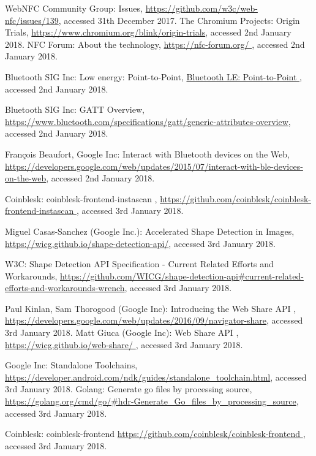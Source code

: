 \begin{thebibliography}{99}
WebNFC Community Group: Issues, \url{https://github.com/w3c/web-nfc/issues/139}, accessed 31th December 2017.
The Chromium Projects: Origin Trials, \url{https://www.chromium.org/blink/origin-trials}, accessed 2nd January 2018.
NFC Forum: About the technology, \url{https://nfc-forum.org/
}, accessed 2nd January 2018.

Bluetooth SIG Inc: Low energy: Point-to-Point, \url{Bluetooth LE: Point-to-Point
}, accessed 2nd January 2018.

Bluetooth SIG Inc: GATT Overview, \url{https://www.bluetooth.com/specifications/gatt/generic-attributes-overview}, accessed 2nd January 2018.

François Beaufort, Google Inc: Interact with Bluetooth devices on the Web, \url{https://developers.google.com/web/updates/2015/07/interact-with-ble-devices-on-the-web}, accessed 2nd January 2018.

Coinblesk: coinblesk-frontend-instascan
, \url{https://github.com/coinblesk/coinblesk-frontend-instascan
}, accessed 3rd January 2018.

Miguel Casas-Sanchez (Google Inc.): Accelerated Shape Detection in Images, \url{https://wicg.github.io/shape-detection-api/}, accessed 3rd January 2018.

W3C: Shape Detection API Specification 
- Current Related Efforts and Workarounds, \url{https://github.com/WICG/shape-detection-api#current-related-efforts-and-workarounds-wrench}, accessed 3rd January 2018.

 Paul Kinlan, Sam Thorogood (Google Inc): Introducing the Web Share API
, \url{https://developers.google.com/web/updates/2016/09/navigator-share}, accessed 3rd January 2018.
 Matt Giuca (Google Inc): Web Share API
, \url{https://wicg.github.io/web-share/
}, accessed 3rd January 2018.

 Google Inc: Standalone Toolchains, \url{https://developer.android.com/ndk/guides/standalone_toolchain.html}, accessed 3rd January 2018.
 Golang: Generate go files by processing source, \url{https://golang.org/cmd/go/#hdr-Generate_Go_files_by_processing_source}, accessed 3rd January 2018.

 Coinblesk: coinblesk-frontend \url{https://github.com/coinblesk/coinblesk-frontend
}, accessed 3rd January 2018.


\end{thebibliography}
